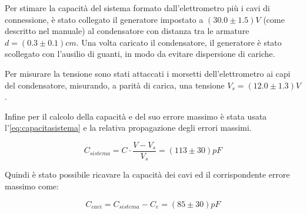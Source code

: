 {\fontsize{11}{14}\selectfont 

Per stimare la capacità del sistema formato dall'elettrometro più i cavi di connessione, è stato collegato il generatore impostato a $(30.0 \pm 1.5) V$ (come descritto nel manuale) al condensatore con distanza tra le armature $d = (0.3 \pm 0.1) cm$. Una volta caricato il condensatore, il generatore è stato scollegato con l'ausilio di guanti, in modo da evitare dispersione di cariche. 
\par
Per misurare la tensione sono stati attaccati i morsetti dell'elettrometro ai capi del condensatore, misurando, a parità di carica, una tensione $V_s = (12.0 \pm 1.3) V$.
\par
Infine per il calcolo della capacità e del suo errore massimo è stata usata l'\autoref{eq:capacitasistema} e la relativa propagazione degli errori massimi.

\begin{equation} \label{eq:capacitasistema}
    C_{sistema} = C \cdot \dfrac{V - V_s}{V_s} = (113 \pm 30) pF
\end{equation}


\par
Quindi è stato possibile ricavare la capacità dei cavi ed il corrispondente errore massimo come:

\begin{equation}
    C_{cavi} = C_{sistema} - C_e = (85 \pm 30) pF
\end{equation}
\par}